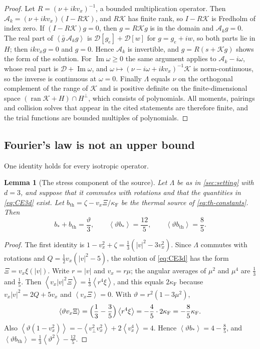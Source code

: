 \documentclass[11pt]{article}
\newcommand{\av}[1]{\left\langle #1\right\rangle}
\newcommand{\D}{\mathcal D}
\newcommand{\A}{\mathcal A}
\newcommand{\F}{\kappa_{\mathrm F}}
\newcommand{\Imag}{\operatorname{Im}}
\newcommand{\thr}{\mathrm{th}}
\newtheorem{lemma}[theorem]{Lemma}
\theoremstyle{definition}
\theoremstyle{remark}
\numberwithin{equation}{section}
\begin{document}
\begin{proof}
Let $R=(\nu+ikv_x)^{-1}$, a bounded multiplication operator. Then
$\A_k=(\nu+ikv_x)(I-R\mathcal K)$, and $R\mathcal K$ has finite rank, so
$I-R\mathcal K$ is Fredholm of index zero. If $(I-R\mathcal K)g=0$, then
$g=R\mathcal Kg$ is in the domain and $\A_kg=0$. The real part of
$\av{\bar g\,\A_kg}$ is $\D[g_e]+\D[w]$ for $g=g_e+iw$, so both parts lie
in $H$; then $ikv_xg=0$ and $g=0$. Hence $\A_k$ is invertible, and
$g=R(s+\mathcal Kg)$ shows the form of the solution. For
$\Imag\omega\geq0$ the same argument applies to
$\A_k-i\omega$, whose real part is $\D+\Imag\omega$, and
$\omega\mapsto(\nu-i\omega+ikv_x)^{-1}\mathcal K$ is norm-continuous, so
the inverse is continuous at $\omega=0$. Finally $\Lambda$ equals $\nu$
on the orthogonal complement of the range of $\mathcal K$ and is positive
definite on the finite-dimensional space
$(\operatorname{ran}\mathcal K+H)\cap H^\perp$, which consists of
polynomials. All moments, pairings and collision solves that appear in
the cited statements are therefore finite, and the trial functions are
bounded multiples of polynomials.
\end{proof}

\subsection{Fourier's law is not an upper bound}\label{sec:ce-fourier}

One identity holds for every isotropic operator.

\begin{lemma}[The stress component of the source]\label{lem:ce-stress}
Let $\Lambda$ be as in \cref{sec:setting} with $d=3$, and suppose that it
commutes with rotations and that the quantities in \eqref{eq:CE3d} exist.
Let $b_\thr=\zeta-v_x\Xi/\F$ be the thermal source of
\eqref{eq:th-constants}. Then
\begin{equation}
 b_*+b_\thr=\frac\vartheta3,\qquad
 \av{\vartheta b_*}=\frac{12}5,\qquad
 \av{\vartheta b_\thr}=\frac85 .
 \label{eq:ce-stress}
\end{equation}
\end{lemma}

\begin{proof}
The first identity is $1-v_x^2+\zeta=\tfrac13(|v|^2-3v_x^2)$. Since
$\Lambda$ commutes with rotations and $Q=\tfrac12v_x(|v|^2-5)$, the
solution of \eqref{eq:CE3d} has the form $\Xi=v_x\xi(|v|)$. Write
$r=|v|$ and $v_x=r\mu$; the angular averages of $\mu^2$ and $\mu^4$ are
$\tfrac13$ and $\tfrac15$. Then
$\av{v_x|v|^2\Xi}=\tfrac13\av{r^4\xi}$, and this equals $2\F$ because
$v_x|v|^2=2Q+5v_x$ and $\av{v_x\Xi}=0$. With
$\vartheta=r^2(1-3\mu^2)$,
\[
 \av{\vartheta v_x\Xi}=\Bigl(\frac13-\frac35\Bigr)\av{r^4\xi}
   =-\frac45\cdot2\F=-\frac85\F .
\]
Also $\av{\vartheta(1-v_x^2)}=-\av{v_\perp^2v_x^2}+2\av{v_x^4}=4$. Hence
$\av{\vartheta b_*}=4-\tfrac85$, and
$\av{\vartheta b_\thr}=\tfrac13\av{\vartheta^2}-\tfrac{12}5$.
\end{proof}
\end{document}
